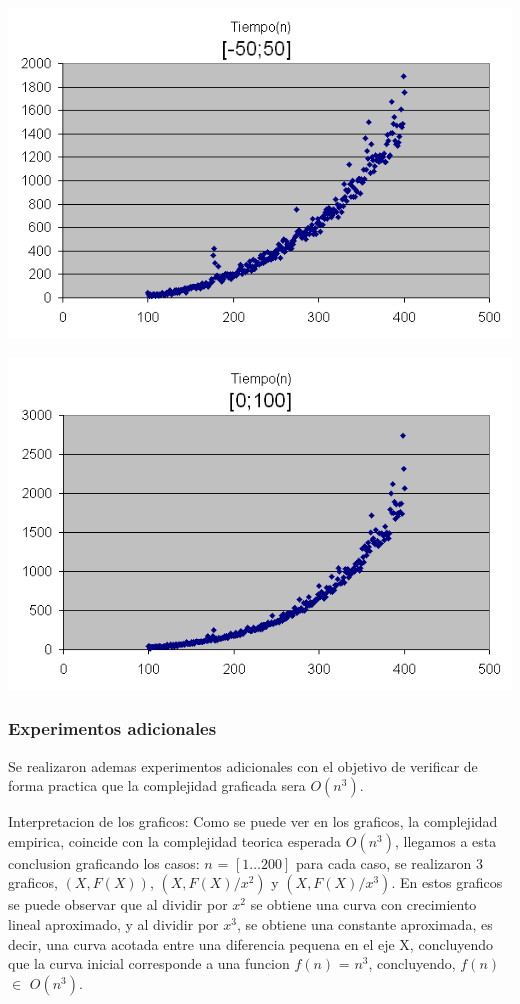 \begin{center}
	\includegraphics[scale=0.6]{images/ej1_2.png}
\end{center}

\begin{center}
	\includegraphics[scale=0.6]{images/ej1_3.png}
\end{center}


\subsubsection{Experimentos adicionales}
Se realizaron ademas experimentos adicionales con el objetivo de verificar de forma practica que la complejidad graficada sera $O(n^3)$.

\vspace{2mm}

Interpretacion de los graficos: Como se puede ver en los graficos, la complejidad empirica, coincide con la complejidad teorica esperada $O(n^3)$, llegamos a esta conclusion graficando los casos: $n$ = $[1\dots200]$ para cada caso, se realizaron 3 graficos, $(X,F(X))$,  $(X,F(X)/x^2)$ y $(X,F(X)/x^3)$. En estos graficos se puede observar que al dividir por $x^2$ se obtiene una curva con crecimiento lineal aproximado, y al dividir por $x^3$, se obtiene una constante aproximada, es decir, una curva acotada entre una diferencia pequena en el eje X, concluyendo que la curva inicial corresponde a una funcion $f(n)$ = $n^3$, concluyendo, $f(n)$ $\in$ $O(n^3)$.


